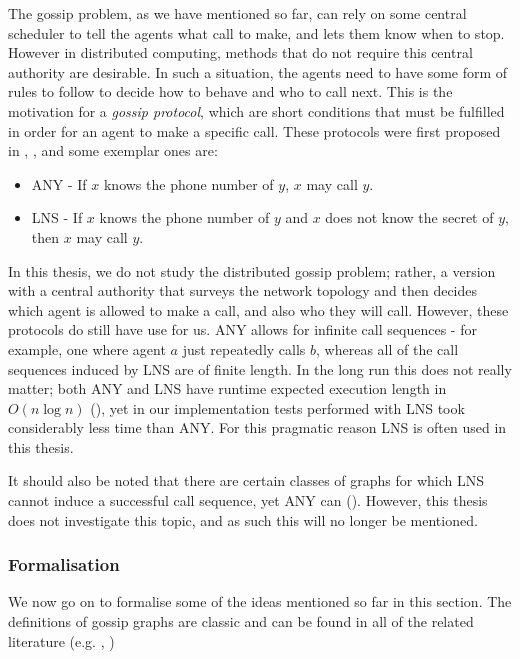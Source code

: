\documentclass[12pt, a4paper]{article}
\begin{document}
The gossip problem, as we have mentioned so far, can rely on some central
scheduler to tell the agents what call to make, and lets them know when to stop.
However in distributed computing, methods that do not require this central
authority are desirable. In such a situation, the agents need to have some form
of rules to follow to decide how to behave and who to call next. This is the
motivation for a \textit{gossip protocol}, which are short conditions that must
be fulfilled in order for an agent to make a specific call. These protocols were
first proposed in \cite{EPfDG}, \cite{KnowledgeandGossip}, and some exemplar
ones are:

\begin{itemize}
\item \textsf{ANY} - If $x$ knows the phone number of $y$, $x$ may call $y$.
\item \textsf{LNS} - If $x$ knows the phone number of $y$ and $x$ does not
    know the secret of $y$, then $x$ may call $y$.
\end{itemize}

In this thesis, we do not study the distributed gossip problem; rather, a
version with a central authority that surveys the network topology and then
decides which agent is allowed to make a call, and also who they will call.
However, these protocols do still have use for us. \textsf{ANY} allows for
infinite call sequences - for example, one where agent $a$ just repeatedly calls
$b$, whereas all of the call sequences induced by \textsf{LNS} are of finite
length. In the long run this does not really matter; both \textsf{ANY} and
\textsf{LNS} have runtime expected execution length in $O(n \log n)$
(\cite{DynamicGossip}), yet in our implementation tests performed with
\textsf{LNS} took considerably less time than \textsf{ANY}. For this pragmatic
reason \textsf{LNS} is often used in this thesis.

It should also be noted that there are certain classes of graphs for which
\textsf{LNS} cannot induce a successful call sequence, yet \textsf{ANY} can
(\cite{DynamicGossip}). However, this thesis does not investigate this topic,
and as such this will no longer be mentioned. 

\subsubsection{Formalisation}

We now go on to formalise some of the ideas mentioned so far in this section.
The definitions of gossip graphs are classic and can be found in all of the
related literature (e.g. \cite{DynamicGossip}, \cite{MalvinThesis})
\end{document}
